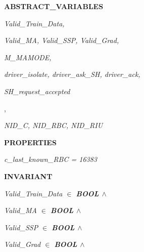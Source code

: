 \documentclass[11pt]{article}
\begin{document}
\begin{sloppypar}
\hspace*{0.20in}

\bf ABSTRACT\_VARIABLES

\hspace*{0.20in}

\hspace*{0.20in}\hspace*{0.20in}\it Valid\_Train\_Data\rm ,

\hspace*{0.20in}\it Valid\_MA\rm , \it Valid\_SSP\rm , \it Valid\_Grad\rm ,

\hspace*{0.20in}\it M\_MAMODE\rm ,

\hspace*{0.20in}\it driver\_isolate\rm , \it driver\_ask\_SH\rm , \it driver\_ack\rm ,

\hspace*{0.20in}\it SH\_request\_accepted

\hspace*{0.20in}

\hspace*{0.20in}\rm ,

\hspace*{0.20in}\hspace*{0.20in}\it NID\_C\rm , \it NID\_RBC\rm , \it NID\_RIU

\hspace*{0.20in}

\bf PROPERTIES

\hspace*{0.20in}\it c\_last\_known\_RBC \rm = \rm 1\rm 6\rm 3\rm 8\rm 3

\hspace*{0.20in}

\bf INVARIANT

\hspace*{0.20in}\it Valid\_Train\_Data  $\in$ \hspace*{0.10in}\bf BOOL  $\land$ 

\hspace*{0.20in}\hspace*{0.20in}\it Valid\_MA  $\in$  \bf BOOL  $\land$ 

\hspace*{0.20in}\hspace*{0.20in}\it Valid\_SSP  $\in$  \bf BOOL  $\land$ 

\hspace*{0.20in}\hspace*{0.20in}\it Valid\_Grad  $\in$ \hspace*{0.10in}\bf BOOL  $\land$ 


\end{sloppypar}
\end{document}

